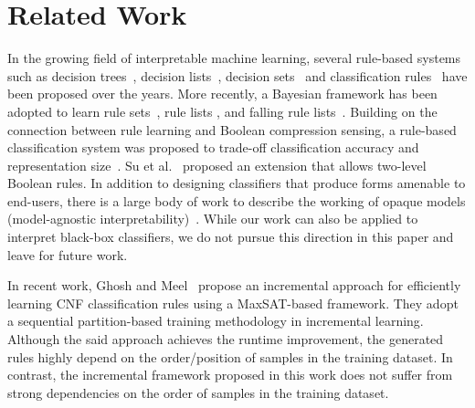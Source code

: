 \section{Related Work}
\label{interpretability_crr_sec:related_work}
In the growing field of interpretable machine learning,  several rule-based systems such as decision trees~\cite{narodytska2018learning},  decision lists~\cite{R1987}, decision sets~\cite{ignatiev2018sat,lakkaraju2016interpretable} and classification rules~\cite{C1995,DGW2018} have been proposed over the years. More recently, a Bayesian framework has been adopted to learn rule sets~\cite{WRDLKM2017}, rule lists \cite{LRMM2015},  and falling rule lists~\cite{WR2015}. Building on the connection between rule learning and Boolean compression sensing,  a rule-based classification system was proposed to trade-off classification accuracy and representation size~\cite{MV2013}. Su et al.~\cite{SWVM2015} proposed an extension that allows two-level Boolean rules. In addition to designing classifiers that produce forms amenable to end-users, there is a large body of work to describe the working of opaque models (model-agnostic interpretability)~\cite{LKCL2019,lundberg2017unified,ribeiro2016should}.  While our work can also be applied to interpret black-box classifiers, we do not pursue this direction in this paper and leave for future work. 


In recent work,  Ghosh and Meel~\cite{ghosh19incremental} propose an incremental approach for efficiently learning CNF classification rules using a MaxSAT-based framework. They adopt a sequential partition-based training methodology in incremental learning. Although the said approach achieves the runtime improvement,  the generated rules highly depend on the order/position of samples in the training dataset. In contrast, the incremental framework proposed in this work does not suffer from strong dependencies on the order of samples in the training dataset.

